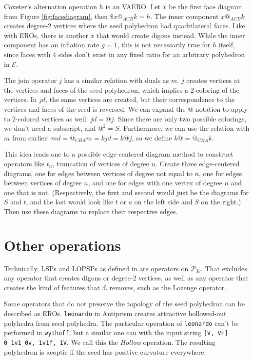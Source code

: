 \documentclass{amsart}[12pt]
\begin{document}
Coxeter's alternation operation $h$ is an VAERO. Let $x$ be the first face
diagram from Figure \ref{fig:facediagram}, then $\$x@_{ACB}k = h$. The inner
component $x@_{ACB}k$ creates degree-2 vertices where the seed polyhedron had
quadrilateral faces. Like with EROs, there is another $x$ that would create
digons instead. While the inner component has an inflation rate $g=1$,
this is not necessarily true for $h$ itself, since faces with 4 sides don't
exist in any fixed ratio for an arbitrary polyhedron in $\mathcal{E}$.

The join operator $j$ has a similar relation with duals as $m$. $j$ creates
vertices at the vertices and faces of the seed polyhedron, which implies a
2-coloring of the vertices. In $jd$, the same vertices are created, but their
correspondence to the vertices and faces of the seed is reversed. We can expand
the $@$ notation to apply to 2-colored vertices as well: $jd = @j$. Since there
are only two possible colorings, we don't need a subscript, and $@^2 = S$.
Furthermore, we can use the relation with $m$ from earlier: $md = @_{CBA}m =
kjd = k@j$, so we define $k@ = @_{CBA}k$.

This idea leads one to a possible edge-centered diagram method to construct
operators like $t_n$, truncation of vertices of degree $n$. Create three
edge-centered diagrams, one for edges between vertices of degree not equal to
$n$, one for edges between vertices of degree $n$, and one for edges with one
vertex of degree $n$ and one that is not. (Respectively, the first and second
would just be the diagrams for $S$ and $t$, and the last would look like $t$ or
$a$ on the left side and $S$ on the right.) Then use these diagrams to replace
their respective edges.

\section{Other operations}

Technically, LSPs and LOPSPs as defined in \cite{brinkmann} are operators on
$\mathcal{P}_{3v}$. That excludes any operator that creates digons or degree-2
vertices, as well as any operator that creates the kind of features that
$\pounds$ removes, such as the Lozenge operator.

Some operators that do not preserve the topology of the seed polyhedron can be
described as EROs. \texttt{leonardo} in Antiprism creates attractive
hollowed-out polyhedra from seed polyhedra. The particular operation of
\texttt{leonardo} can't be performed in \texttt{wythoff}, but a similar one can
with the input string \texttt{[V, VF] 0\_1v1\_0v, 1v1f, 1V}. We call this the
\textit{Hollow} operation. The resulting polyhedron is acoptic if the seed has
positive curvature everywhere.
\end{document}
